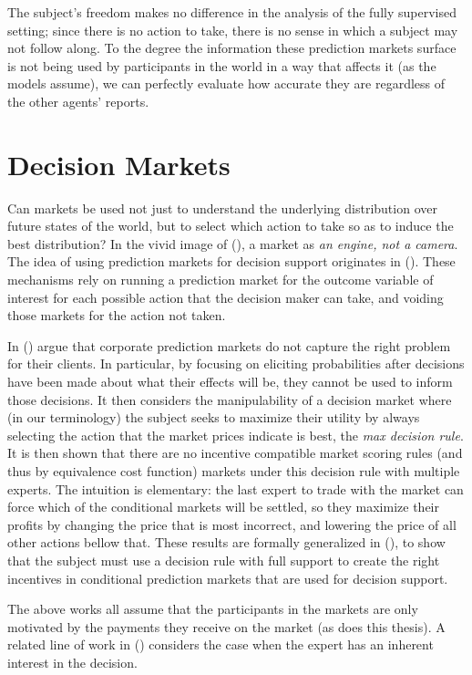 The subject's freedom makes no difference in the analysis of the fully supervised setting; since there is no action to take, there is no sense in which a subject may not follow along. To the degree the information these prediction markets surface is not being used by participants in the world in a way that affects it (as the models assume), we can perfectly evaluate how accurate they are regardless of the other agents' reports.


\section{Decision Markets}

Can markets be used not just to understand the underlying distribution over future states of the world, but to select which action to take so as to induce the best distribution? In the vivid image of (\cite{mackenzie2008engine}), a market as \emph{an engine, not a camera}.
The idea of using prediction markets for decision support originates in (\cite{berg2003prediction,hanson2002decision}). 
These mechanisms rely on running a prediction market for the outcome variable of interest for each possible action that the decision maker can take, and voiding those markets for the action not taken.

In (\cite{othman2010decision}) argue that corporate prediction markets do not capture the right problem for their clients. In particular, by focusing on eliciting probabilities after decisions have been made about what their effects will be, they cannot be used to inform those decisions. It then considers the manipulability of a decision market where (in our terminology) the subject seeks to maximize their utility by always selecting the action that the market prices indicate is best, the \emph{max decision rule}. It is then shown that there are no incentive compatible market scoring rules (and thus by equivalence cost function) markets under this decision rule with multiple experts.
The intuition is elementary: the last expert to trade with the market can force which of the conditional markets will be settled, so they maximize their profits by changing the price that is most incorrect, and lowering the price of all other actions bellow that.
These results are formally generalized in (\cite{chen2014eliciting}), to show that the subject must use a decision rule with full support to create the right incentives in conditional prediction markets that are used for decision support.

The above works all assume that the participants in the markets are only motivated by the payments they receive on the market (as does this thesis). A related line of work in (\cite{boutilier2012eliciting}) considers the case when the expert has an inherent interest in the decision. 


